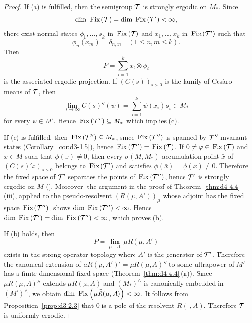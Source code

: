 \begin{proof}
If (a) is fulfilled, then the semigroup $ \mathcal{T} $  is strongly ergodic on $ M_{*} $.
Since
\[
\mathop{}\!\mathrm{dim}\, \mathop{}\mathrm{Fix}\left(\mathcal{T}\right) = \mathop{}\!\mathrm{dim}\, \mathop{}\mathrm{Fix}\left(\mathcal{T}'\right) < \infty,
\]
there exist normal states $ \phi_{1},\ldots,\phi_{k} $  in $ \mathop{}\mathrm{Fix}\left(\mathcal{T}\right) $  and $ x_{1},\ldots,x_{k} $  in $ \mathop{}\mathrm{Fix}\left(\mathcal{T}'\right) $  such that 
%
\[
	\phi_{n}(x_{m}) = \delta_{n,m} \quad (1 \leq n, m \leq k) .
\]
%
Then 
\[
P = \sum_{i=1}^{k} x_{i} \otimes \phi_{i} 
\]
is the associated ergodic projection.
If\/ $ (C(s))_{s>0} $  is the family of Cesàro means of\/ $ \mathcal{T} $, then
\[
\lim_{s \to \infty} C(s)''(\psi) = \sum_{i=1}^{k} \psi(x_{i})\phi_{i} \in M_{*}
\]
for every $ \psi \in M' $.
Hence $ \mathop{}\mathrm{Fix}\left(\mathcal{T}''\right) \subseteq M_{*} $  which implies (c).

If (c) is fulfilled, then $ \mathop{}\mathrm{Fix}\left(\mathcal{T}''\right) \subseteq M_{*} $, since $ \mathop{}\mathrm{Fix}\left(\mathcal{T}''\right) $  is spanned by $ \mathcal{T}'' $-invariant states (Corollary~\ref{cor:d3-1.5}), hence $ \mathop{}\mathrm{Fix}\left(\mathcal{T}''\right) = \mathop{}\mathrm{Fix}\left(\mathcal{T}\right) $.
If\/ $ 0 \neq \phi \in \Fix{\TT} $  and $ x \in M $  such that $ \phi(x) \neq 0 $, then every $ \sigma(M,M_{*}) $-accumulation point $ \bar{x} $  of\/ $ (C(s)'x)_{s > 0} $  belongs to $ \mathop{}\mathrm{Fix}\left(\mathcal{T}'\right) $  and satisfies $ \phi(\bar{x}) = \phi(x) \neq 0 $.
Therefore the fixed space of\/ $ \mathcal{T}' $  separates the points of\/ $ \mathop{}\mathrm{Fix}\left(\mathcal{T}''\right) $, hence $ \mathcal{T}' $  is strongly ergodic on $ M $  (\textcite[Chap.~2, Theorem~1.4]{krengel:1985}).
Moreover, the argument in the proof of Theorem~\ref{thm:d4-4.4}\,(iii), applied to the pseudo-resolvent $ (R(\mu,A'))_{\mu} $  whose adjoint has the fixed space $ \mathop{}\mathrm{Fix}\left(\mathcal{T}''\right) $, shows $ \mathop{}\!\mathrm{dim}\, \mathop{}\mathrm{Fix}\left(\mathcal{T}''\right) < \infty $.
Hence $ \mathop{}\!\mathrm{dim}\, \mathop{}\mathrm{Fix}\left(\mathcal{T}'\right) = \mathop{}\!\mathrm{dim}\, \mathop{}\mathrm{Fix}\left(\mathcal{T}''\right) < \infty $, which proves (b).

If (b) holds, then
\[
P = \lim_{\mu \to 0} \mu R(\mu,A')
\]
exists in the strong operator topology where $ A' $  is the generator of\/ $ \mathcal{T}' $.
Therefore the canonical extension of\/ $ \mu R(\mu,A')' = \mu R(\mu,A)'' $  to some ultrapower of\/ $ M' $  has a finite dimensional fixed space (Theorem~\ref{thm:d4-4.4}\,(ii)).
Since $ \mu R(\mu,A)'' $  extends $ \mu R(\mu,A) $  and $ (M_{*})^{\wedge} $  is canonically embedded in $ (M')^{\wedge} $, we obtain $ \mathop{}\!\mathrm{dim}\, \mathop{}\mathrm{Fix}\left(\mu \widehat{R}(\mu,A)\right) < \infty $.
It follows from Proposition~\ref{prop:d3-2.3} that 0 is a pole of the resolvent $ R(\cdot,A) $.
Therefore $ \mathcal{T} $  is uniformly ergodic.
\end{proof}
